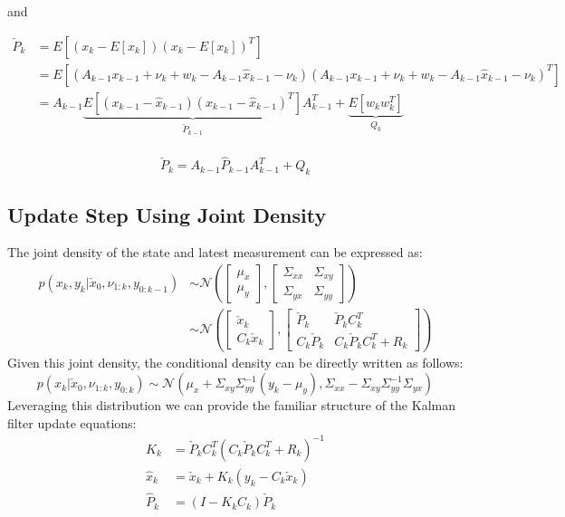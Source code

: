\documentclass[a4paper]{article}
\begin{document}
	and

	\begin{align*}
		\check{P}_k &= E[(x_{k} - E[x_k])(x_{k} - E[x_k])^T] \\
		 &= E[(A_{k-1}x_{k-1} + \nu_k + w_k - A_{k-1}\hat{x}_{k-1} - \nu_k)(A_{k-1}x_{k-1} + \nu_k + w_k - A_{k-1}\hat{x}_{k-1} - \nu_k)^T] \\
		 &= A_{k-1} \underbrace{E[(x_{k-1} - \hat{x}_{k-1})(x_{k-1} - \hat{x}_{k-1})^T]}_{\check{P}_{k-1}} A_{k-1}^T + \underbrace{E[w_kw_k^T]}_{Q_k} \\
	\end{align*}

	\begin{equation}
		\check{P}_k = A_{k-1} \hat{P}_{k-1} A_{k-1}^T + Q_k
		\label{eq:process_covariance}
	\end{equation}

	\subsection{Update Step Using Joint Density}
	The joint density of the state and latest measurement can be expressed as:
	\begin{align}
			p(x_k, y_k | \check{x}_{0}, \nu_{1:k}, y_{0:k-1}) & \sim \mathcal{N} \left(
		\begin{bmatrix}
			\mu_x \\
			\mu_y
		\end{bmatrix},
		\begin{bmatrix}
			\Sigma_{xx} & \Sigma_{xy} \\
			\Sigma_{yx} & \Sigma_{yy}
		\end{bmatrix} \right)\\
		& \sim \mathcal{N} \left(
		\begin{bmatrix}
			\check{x}_k \\
			C_k \check{x}_k
		\end{bmatrix},
		\begin{bmatrix}
			\check{P}_k & \check{P}_k C_k^T \\
			C_k \check{P}_k & C_k \check{P}_k C_k^T + R_k
		\end{bmatrix} \right)
	\end{align}
	Given this joint density, the conditional density can be directly written as follows:
	\begin{equation}
		p(x_k | \check{x}_{0}, \nu_{1:k}, y_{0:k}) \sim \mathcal{N} (\mu_x + \Sigma_{xy} \Sigma_{yy}^{-1} (y_k - \mu_y), \Sigma_{xx} -   \Sigma_{xy} \Sigma_{yy}^{-1} \Sigma_{yx})
	\end{equation}
	Leveraging this distribution we can provide the familiar structure of the Kalman filter update equations:
	\begin{align}
		K_k &=  \check{P}_k C_k^T (C_k \check{P}_k C_k^T + R_k)^{-1} \\
		\hat{x}_k &= \check{x}_k + K_k (y_k - C_k \check{x}_k) \\
		\hat{P}_k &= (I - K_k C_k) \check{P}_k
	\end{align}
\end{document}
